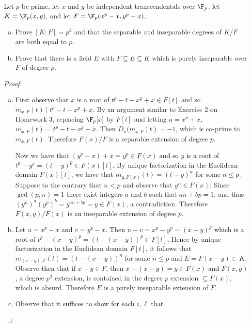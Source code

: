 \documentclass[10pt]{amsart}
\begin{document}
\begin{thm}
  Let $p$ be prime, let $x$ and $y$ be independent transcendentals over $\F_p$, let $K = \F_p(x,y)$, and let $F = \F_p(x^p - x, y^p - x)$.
  \begin{enumerate}[(a)]
  \item
    Prove $[K : F] = p^2$ and that the separable and inseparable degrees of $K/F$ are both equal to $p$.
  \item
    Prove that there is a field $E$ with $F \subseteq E \subseteq K$ which is purely inseparable over $F$ of degree $p$.
  \end{enumerate}

  \begin{proof}
    \begin{enumerate}[(a)]
    \item
      First observe that $x$ is a root of $t^p - t - x^p + x \in F[t]$ and so $m_{x, F}(t) \mid t^p - t - x^p + x$.
      By an argument similar to Exercise 2 on Homework 3, replacing $\F_p[x]$ by $F[t]$ and letting $a = x^p + x$, $m_{x, F}(t) = t^p - t - x^p - x$.
      Then $D_x(m_{x,F}(t) = -1$, which is co-prime to $m_{x,F}(t)$.
      Therefore $F(x)/F$ is a separable extension of degree $p$.
      
      Now we have that $(y^p - x) + x = y^p \in F(x)$ and so $y$ is a root of $t^p - y^p = (t - y)^p \in F(x)[t]$.
      By unique factorization in the Euclidean domain $F(x)[t]$, we have that $m_{y, F(x)}(t) = (t - y)^n$ for some $n \leq p$.
      Suppose to the contrary that $n < p$ and observe that $y^n \in F(x)$.
      Since $\gcd(p,n) = 1$ there exist integers $a$ and $b$ such that $an + bp = 1$, and thus $(y^n)^a(y^p)^b = y^{an + bp} = y \in F(x)$, a contradiction.
      Therefore $F(x,y)/F(x)$ is an inseparable extension of degree $p$. 
    \item
      Let $u = x^p - x$ and $v = y^p - x$.
      Then $u - v = x^p - y^p = (x - y)^p$ which is a root of $t^p - (x - y)^p = (t - (x - y))^p \in F[t]$.
      Hence by unique factorization in the Euclidean domain $F[t]$, it follows that $m_{(x-y), F}(t) = (t - (x - y))^n$ for some $n \leq p$ and $E = F(x - y) \subset K$.
      Observe then that if $x - y \in F$, then $x - (x - y) = y \in F(x)$ and $F(x,y)$, a degree $p^2$ extension, is contained in the degree $p$ extension $\subseteq F(x)$, which is absurd.
      Therefore $E$ is a purely inseparable extension of $F$.
    \item
      Observe that it suffices to show for each $i, \ell$ that 
    \end{enumerate}
  \end{proof}
\end{thm}
\end{document}
